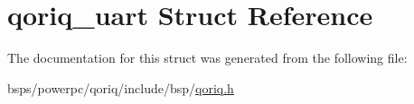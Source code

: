 \hypertarget{structqoriq__uart}{}\section{qoriq\+\_\+uart Struct Reference}
\label{structqoriq__uart}


The documentation for this struct was generated from the following file\+:\begin{DoxyCompactItemize}
\item 
bsps/powerpc/qoriq/include/bsp/\mbox{\hyperlink{qoriq_8h}{qoriq.\+h}}\end{DoxyCompactItemize}

